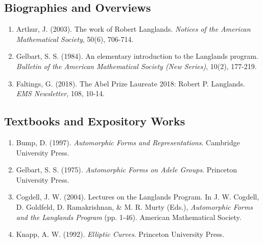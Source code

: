 \subsection*{Biographies and Overviews}
\begin{enumerate}
    \item Arthur, J. (2003). The work of Robert Langlands. \textit{Notices of the American Mathematical Society}, 50(6), 706-714.
    \item Gelbart, S. S. (1984). An elementary introduction to the Langlands program. \textit{Bulletin of the American Mathematical Society (New Series)}, 10(2), 177-219.
    \item Faltings, G. (2018). The Abel Prize Laureate 2018: Robert P. Langlands. \textit{EMS Newsletter}, 108, 10-14.
\end{enumerate}

\subsection*{Textbooks and Expository Works}
\begin{enumerate}
    \item Bump, D. (1997). \textit{Automorphic Forms and Representations}. Cambridge University Press.
    \item Gelbart, S. S. (1975). \textit{Automorphic Forms on Adele Groups}. Princeton University Press.
    \item Cogdell, J. W. (2004). Lectures on the Langlands Program. In J. W. Cogdell, D. Goldfeld, D. Ramakrishnan, \& M. R. Murty (Eds.), \textit{Automorphic Forms and the Langlands Program} (pp. 1-46). American Mathematical Society.
    \item Knapp, A. W. (1992). \textit{Elliptic Curves}. Princeton University Press.
\end{enumerate}
